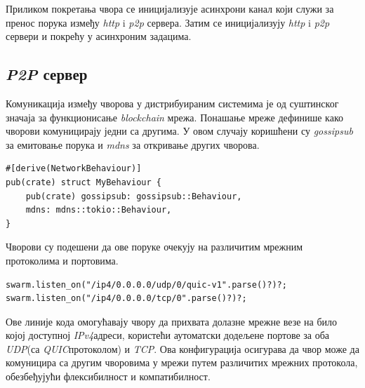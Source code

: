 \documentclass[12pt, a4paper]{article}
\begin{document}
Приликом покретања чвора се иницијализује асинхрони канал који служи за пренос порука између \textit{http} i \textit{p2p} сервера. Затим се иницијализују \textit{http} i \textit{p2p} сервери и покрећу у асинхроним задацима.

\subsection{\textit{P2P} сервер}
Комуникација између чворова у дистрибуираним системима је од суштинског значаја за функционисање \textit{blockchain} мрежа.
Понашање мреже дефинише како чворови комуницирају једни са другима. У овом случају коришћени су \textit{gossipsub} за емитовање порука и \textit{mdns} за откривање других чворова.

\begin{verbatim}
#[derive(NetworkBehaviour)]
pub(crate) struct MyBehaviour {
    pub(crate) gossipsub: gossipsub::Behaviour,
    mdns: mdns::tokio::Behaviour,
}
\end{verbatim}

Чворови су подешени да ове поруке очекују на различитим мрежним протоколима и портовима.

\begin{verbatim}
swarm.listen_on("/ip4/0.0.0.0/udp/0/quic-v1".parse()?)?;
swarm.listen_on("/ip4/0.0.0.0/tcp/0".parse()?)?;
\end{verbatim}

\newpage
Ове линије кода омогућавају чвору да прихвата долазне мрежне везе на било којој доступној \textit{IPv4}\footnotemark[1] адреси, користећи аутоматски додељене портове за оба \textit{UDP}\footnotemark[2] (са \textit{QUIC}\footnotemark[3] протоколом) и \textit{TCP}\footnotemark[4]. Ова конфигурација осигурава да чвор може да комуницира са другим чворовима у мрежи путем различитих мрежних протокола, обезбеђујући флексибилност и компатибилност.


\end{document}
